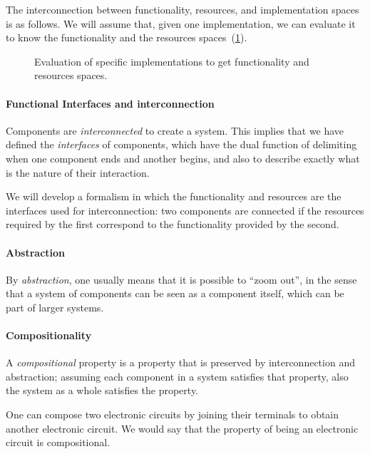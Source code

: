 The interconnection between functionality, resources, and implementation spaces
is as follows. We will assume that, given one implementation, we can evaluate it
to know the functionality and the resources spaces~(\cref{fig:FIR}).

\begin{figure}[h!]
  \centering
  \caption{Evaluation of specific implementations to get functionality and resources spaces.\label{fig:FIR}}
\end{figure}

\paragraph{Functional Interfaces and interconnection}

Components are \emph{interconnected} to create a system.
This implies that we have defined the \emph{interfaces} of components, which
have the dual function of delimiting when one component ends and another begins,
and also to describe exactly what is the nature of their interaction.

We will develop a formalism in which the functionality and resources
are the interfaces used for interconnection: two components are connected
if the resources required by the first correspond to the functionality
provided by the second.

\paragraph{Abstraction}

By \emph{abstraction}, one usually means that it is possible to ``zoom out'',
in the sense that a system of components can be seen as a component itself,
which can be part of larger systems.


\paragraph{Compositionality}

A \emph{compositional} property is a property that is preserved by interconnection and abstraction; assuming each component in a system satisfies that property, also the system as a whole satisfies the property.

\begin{example}
  One can compose two electronic circuits by joining their terminals to obtain
  another electronic circuit. We would say that the property
  of being an electronic circuit is compositional.
\end{example}

